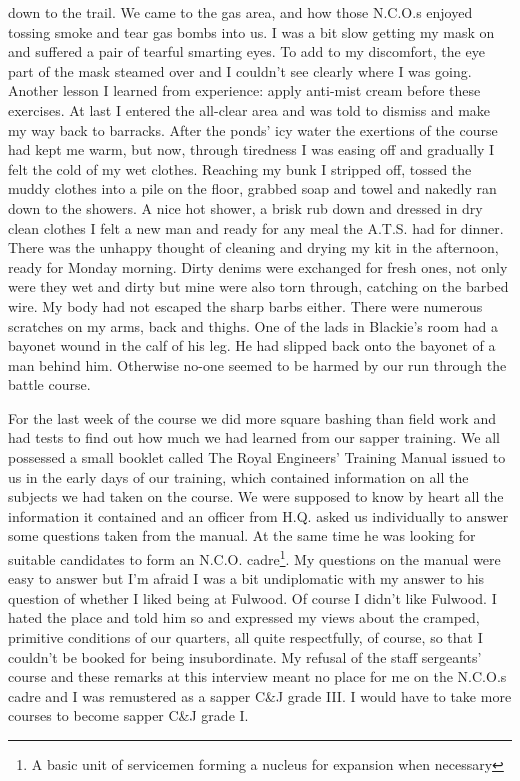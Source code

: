 down to the trail. We came to the gas area, and how those N.C.O.s
enjoyed tossing smoke and tear gas bombs into us. I was a bit slow
getting my mask on and suffered a pair of tearful smarting eyes. To
add to my discomfort, the eye part of the mask steamed over and I
couldn't see clearly where I was going.  Another lesson I learned from
experience: apply anti-mist cream before these exercises. At last I
entered the all-clear area and was told to dismiss and make my way
back to barracks. After the ponds' icy water the exertions of the
course had kept me warm, but now, through tiredness I was easing off
and gradually I felt the cold of my wet clothes. Reaching my bunk I
stripped off, tossed the muddy clothes into a pile on the floor,
grabbed soap and towel and nakedly ran down to the showers. A nice hot
shower, a brisk rub down and dressed in dry clean clothes I felt a new
man and ready for any meal the A.T.S. had for dinner. There was the
unhappy thought of cleaning and drying my kit in the afternoon, ready
for Monday morning.  Dirty denims were exchanged for fresh ones, not
only were they wet and dirty but mine were also torn through, catching
on the barbed wire.  My body had not escaped the sharp barbs
either. There were numerous scratches on my arms, back and thighs. One
of the lads in Blackie's room had a bayonet wound in the calf of his
leg. He had slipped back onto the bayonet of a man behind
him. Otherwise no-one seemed to be harmed by our run through the
battle course.

For the last week of the course we did more square bashing than field
work and had tests to find out how much we had learned from our sapper
training. We all possessed a small booklet called The Royal Engineers'
Training Manual issued to us in the early days of our training, which
contained information on all the subjects we had taken on the
course. We were supposed to know by heart all the information it
contained and an officer from H.Q. asked us individually to answer
some questions taken from the manual. At the same time he was looking
for suitable candidates to form an N.C.O. cadre\footnote{A basic unit
of servicemen forming a nucleus for expansion when necessary}. My
questions on the manual were easy to answer but I'm afraid I was a bit
undiplomatic with my answer to his question of whether I liked being
at Fulwood.  Of course I didn't like Fulwood. I hated the place and
told him so and expressed my views about the cramped, primitive
conditions of our quarters, all quite respectfully, of course, so that
I couldn't be booked for being insubordinate. My refusal of the staff
sergeants' course and these remarks at this interview meant no place
for me on the N.C.O.s cadre and I was remustered as a sapper C\&J
grade III. I would have to take more courses to become sapper C\&J
grade I.

